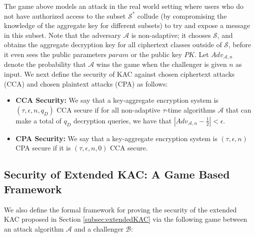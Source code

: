 The game above models an attack in the real world setting where users who do not have authorized access to the subset ${\mathcal{S}}^{*}$ collude (by compromising the knowledge of the aggregate key for different subsets) to try and expose a message in this subset. Note that the adversary $\mathcal{A}$ is non-adaptive; it chooses $\mathcal{S}$, and obtains the aggregate decryption key for all ciphertext classes outside of $\mathcal{S}$, before it even sees the public parameters $param$ or the public key $PK$. Let $Adv_{\mathcal{A},n}$ denote the probability that $\mathcal{A}$ wins the game when the challenger is given $n$ as input. We next define the security of KAC against chosen ciphertext attacks (CCA) and chosen plaintext attacks (CPA) as follows:

\begin{itemize}
 \item \textbf{CCA Security:} We say that a key-aggregate encryption system is $(\tau,\epsilon,n,q_D)$ CCA secure if for all non-adaptive $\tau$-time algorithms $\mathcal{A}$ that can make a total of $q_D$ decryption queries, we have that $|Adv_{\mathcal{A},n}-\frac{1}{2}| < \epsilon$. 
 
 \item \textbf{CPA Security:} We say that a key-aggregate encryption system is $(\tau,\epsilon,n)$ CPA secure if it is $(\tau,\epsilon,n,0)$ CCA secure.
 
\end{itemize}

\subsection{Security of Extended KAC: A Game Based Framework}
\label{subsec:gameextended}

We also define the formal framework for proving the security of the extended KAC proposed in Section \ref{subsec:extendedKAC} via the following game between an attack algorithm $\mathcal{A}$ and a challenger $\mathcal{B}$:

